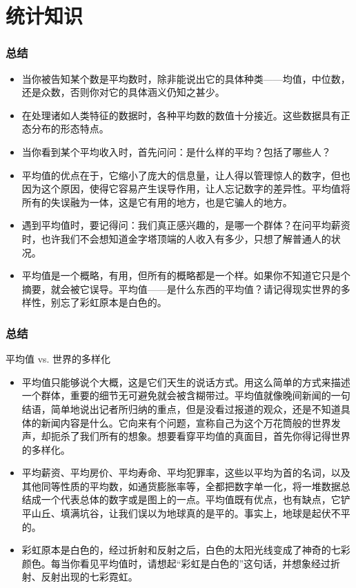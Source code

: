 \section{统计知识}
\begin{frame}
  \frametitle{总结}
  \begin{itemize}
    \item 当你被告知某个数是平均数时，除非能说出它的具体种类——均值，中位数，还是众数，否则你对它的具体涵义仍知之甚少。
    \item 在处理诸如人类特征的数据时，各种平均数的数值十分接近。这些数据具有正态分布的形态特点。
    \item 当你看到某个平均收入时，首先问问：是什么样的平均？包括了哪些人？
    \item 平均值的优点在于，它缩小了庞大的信息量，让人得以管理惊人的数字，但也因为这个原因，使得它容易产生误导作用，让人忘记数字的差异性。平均值将所有的失误融为一体，这是它有用的地方，也是它骗人的地方。
    \item 遇到平均值时，要记得问：我们真正感兴趣的，是哪一个群体？在问平均薪资时，也许我们不会想知道金字塔顶端的人收入有多少，只想了解普通人的状况。
    \item 平均值是一个概略，有用，但所有的概略都是一个样。如果你不知道它只是个摘要，就会被它误导。平均值——是什么东西的平均值？请记得现实世界的多样性，别忘了彩虹原本是白色的。
  \end{itemize}
\end{frame}

\begin{frame}
  \frametitle{总结}
  \begin{block}{平均值 vs. 世界的多样化}
    \begin{itemize}
      \item 平均值只能够说个大概，这是它们天生的说话方式。用这么简单的方式来描述一个群体，重要的细节无可避免就会被含糊带过。平均值就像晚间新闻的一句结语，简单地说出记者所归纳的重点，但是没看过报道的观众，还是不知道具体的新闻内容是什么。它向来有个问题，宣称自己为这个万花筒般的世界发声，却扼杀了我们所有的想象。想要看穿平均值的真面目，首先你得记得世界的多样化。
      \item 平均薪资、平均房价、平均寿命、平均犯罪率，这些以平均为首的名词，以及其他同等性质的平均数，如通货膨胀率等，全都把数字单一化，将一堆数据总结成一个代表总体的数字或是图上的一点。平均值既有优点，也有缺点，它铲平山丘、填满坑谷，让我们误以为地球真的是平的。事实上，地球是起伏不平的。
      \item 彩虹原本是白色的，经过折射和反射之后，白色的太阳光线变成了神奇的七彩颜色。每当你看见平均值时，请想起“彩虹是白色的”这句话，并想象经过折射、反射出现的七彩霓虹。
    \end{itemize}
  \end{block}
\end{frame}




